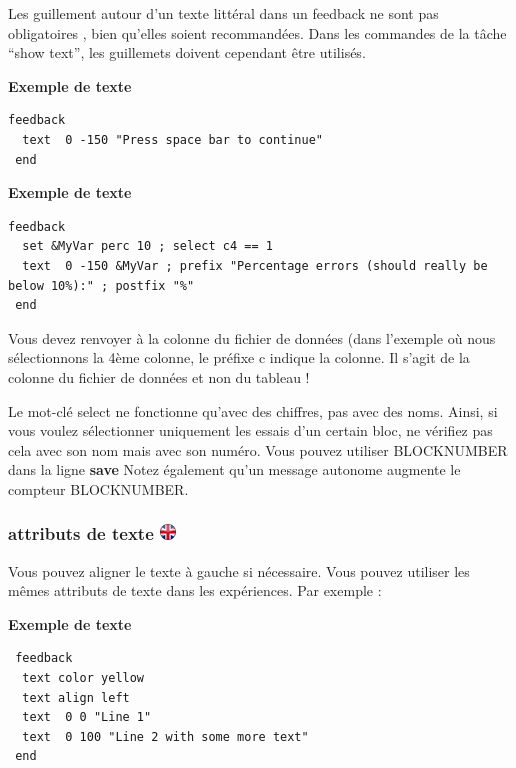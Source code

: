 \documentclass[
]{book}
\begin{document}
Les guillement autour d'un texte littéral dans un feedback ne sont pas
obligatoires , bien qu'elles soient recommandées. Dans les commandes de
la tâche ``show text'', les guillemets doivent cependant être utilisés.

\textbf{Exemple de texte}

\begin{verbatim}
feedback
  text  0 -150 "Press space bar to continue"
 end
\end{verbatim}

\textbf{Exemple de texte}

\begin{verbatim}
feedback
  set &MyVar perc 10 ; select c4 == 1
  text  0 -150 &MyVar ; prefix "Percentage errors (should really be below 10%):" ; postfix "%"
 end
\end{verbatim}

Vous devez renvoyer à la colonne du fichier de données (dans l'exemple
où nous sélectionnons la 4ème colonne, le préfixe c indique la colonne.
Il s'agit de la colonne du fichier de données et non du tableau !

Le mot-clé select ne fonctionne qu'avec des chiffres, pas avec des noms.
Ainsi, si vous voulez sélectionner uniquement les essais d'un certain
bloc, ne vérifiez pas cela avec son nom mais avec son numéro. Vous
pouvez utiliser BLOCKNUMBER dans la ligne \textbf{save} Notez également
qu'un message autonome augmente le compteur BLOCKNUMBER.

\hypertarget{attributs-de-texte-ukflag}{%
\subsubsection[attributs de texte ]{\texorpdfstring{attributs de texte
\href{https://www.psytoolkit.org/doc3.1.0/feedback.html\#_text_attributes}{\protect\includegraphics{img/ukflag.png}}}{attributs de texte ukflag}}\label{attributs-de-texte-ukflag}}

Vous pouvez aligner le texte à gauche si nécessaire. Vous pouvez
utiliser les mêmes attributs de texte dans les expériences. Par exemple
:

\textbf{Exemple de texte}

\begin{verbatim}
 feedback
  text color yellow
  text align left
  text  0 0 "Line 1"
  text  0 100 "Line 2 with some more text"
 end
\end{verbatim}
\end{document}
